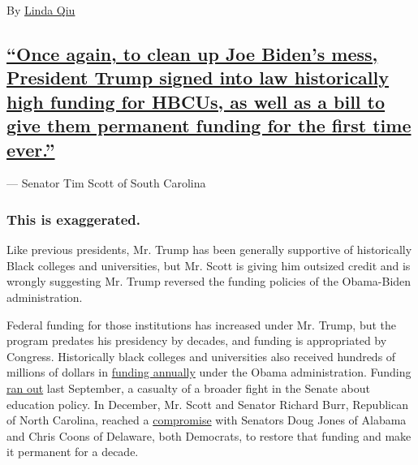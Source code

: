 By \href{https://www.nytimes3xbfgragh.onion/by/linda-qiu}{Linda Qiu}

\hypertarget{once-again-to-clean-up-joe-bidens-mess-president-trump-signed-into-law-historically-high-funding-for-hbcus-as-well-as-a-bill-to-give-them-permanent-funding-for-the-first-time-ever}{%
\subsection{\texorpdfstring{\protect\hyperlink{once-again-to-clean-up-joe-bidens-mess-president-trump-signed-into-law-historically-high-funding-for-hbcus-as-well-as-a-bill-to-}{``Once
again, to clean up Joe Biden's mess, President Trump signed into law
historically high funding for HBCUs, as well as a bill to give them
permanent funding for the first time
ever.''}}{``Once again, to clean up Joe Biden's mess, President Trump signed into law historically high funding for HBCUs, as well as a bill to give them permanent funding for the first time ever.''}}\label{once-again-to-clean-up-joe-bidens-mess-president-trump-signed-into-law-historically-high-funding-for-hbcus-as-well-as-a-bill-to-give-them-permanent-funding-for-the-first-time-ever}}

--- Senator Tim Scott of South Carolina

\hypertarget{this-is-exaggerated}{%
\subsubsection{\texorpdfstring{\textbf{This is
exaggerated.}}{This is exaggerated.}}\label{this-is-exaggerated}}

Like previous presidents, Mr. Trump has been generally supportive of
historically Black colleges and universities, but Mr. Scott is giving
him outsized credit and is wrongly suggesting Mr. Trump reversed the
funding policies of the Obama-Biden administration.

Federal funding for those institutions has increased under Mr. Trump,
but the program predates his presidency by decades, and funding is
appropriated by Congress. Historically black colleges and universities
also received hundreds of millions of dollars in
\href{https://slack-redir.net/link?url=https\%3A\%2F\%2Ffas.org\%2Fsgp\%2Fcrs\%2Fmisc\%2FR43351.pdf\%23page\%3D31}{funding
annually} under the Obama administration. Funding
\href{https://slack-redir.net/link?url=https\%3A\%2F\%2Fwww.nytimes3xbfgragh.onion\%2F2019\%2F11\%2F08\%2Fus\%2Fpolitics\%2Fstem-funding-hbcus.html}{ran
out} last September, a casualty of a broader fight in the Senate about
education policy. In December, Mr. Scott and Senator Richard Burr,
Republican of North Carolina, reached a
\href{https://slack-redir.net/link?url=https\%3A\%2F\%2Fwww.usnews.com\%2Fnews\%2Feducation-news\%2Farticles\%2F2019-12-04\%2Fsenate-reaches-bipartisan-agreement-to-fund-hbcus}{compromise}
with Senators Doug Jones of Alabama and Chris Coons of Delaware, both
Democrats, to restore that funding and make it permanent for a decade.

